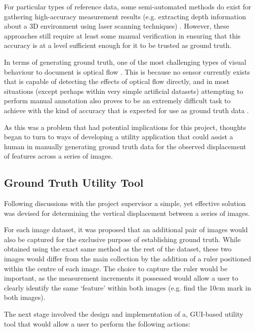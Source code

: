 For particular types of reference data, some semi-automated methods do exist for gathering high-accuracy measurement results (e.g. extracting depth information about a 3D environment using laser scanning techniques) \cite{haltakov}. However, these approaches still require at least some manual verification in ensuring that this accuracy is at a level sufficient enough for it to be trusted as ground truth.

In terms of generating ground truth, one of the most challenging types of visual behaviour to document is optical flow \cite{kondermann}. This is because no sensor currently exists that is capable of detecting the effects of optical flow directly, and in most situations (except perhaps within very simple artificial datasets) attempting to perform manual annotation also proves to be an extremely difficult task to achieve with the kind of accuracy that is expected for use as ground truth data \cite{haltakov}. 

As this was a problem that had potential implications for this project, thoughts began to turn to ways of developing a utility application that could assist a human in manually generating ground truth data for the observed displacement of features across a series of images. 

\subsection{Ground Truth Utility Tool}

Following discussions with the project supervisor a simple, yet effective solution was devised for determining the vertical displacement between a series of images. 

For each image dataset, it was proposed that an additional pair of images would also be captured for the exclusive purpose of establishing ground truth. While obtained using the exact same method as the rest of the dataset, these two images would differ from the main collection by the addition of a ruler positioned within the centre of each image. The choice to capture the ruler would be important, as the measurement increments it possessed would allow a user to clearly identify the same `feature' within both images (e.g. find the 10cm mark in both images).

The next stage involved the design and implementation of a, GUI-based utility tool that would allow a user to perform the following actions:

